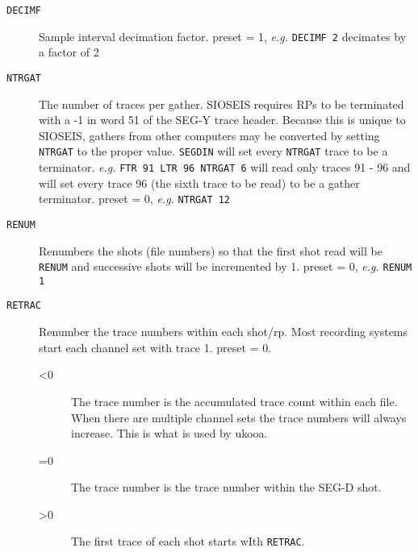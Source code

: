\begin{description}
\item[\texttt{DECIMF}] Sample interval decimation factor.  \Gls{preset} = 1,     \textit{e.g.}   \texttt{DECIMF 2} decimates by a factor of 2

\item[\texttt{NTRGAT}] The number of traces per \gls{gather}.  SIOSEIS requires RPs to be
         terminated with a -1 in word 51 of the SEG-Y trace header.
         Because this is unique to SIOSEIS, \glspl{gather} from other
         computers may be converted by setting \texttt{NTRGAT} to the proper
         value.  \texttt{SEGDIN} will set every \texttt{NTRGAT} trace to be a
         terminator.  \textit{e.g.} \texttt{FTR 91 LTR 96 NTRGAT 6} will read only
         traces 91 - 96 and will set every trace 96 (the sixth trace
         to be read) to be a \gls{gather} terminator.
         \Gls{preset} = 0,    \textit{e.g.}  \texttt{NTRGAT 12}

\item[\texttt{RENUM}] Renumbers the \glspl{shot} (file numbers) so that the first \gls{shot}
         read will be \texttt{RENUM} and successive \glspl{shot} will be incremented
         by 1.
         \Gls{preset} = 0,    \textit{e.g.}   \texttt{RENUM 1}

\item[\texttt{RETRAC}] Renumber the trace numbers within each \gls{shot}/\gls{rp}.  Most recording
         systems start each channel set with trace 1.
         \Gls{preset} = 0.
\begin{description}
     \item[<0] The trace number is the accumulated trace count within each
         file.  When there are multiple channel sets the trace numbers
         will always increase.  This is what is used by \gls{ukooa}.
     \item[=0] The trace number is the trace number within the SEG-D \gls{shot}.
     \item[>0] The first trace of each \gls{shot} starts wIth \texttt{RETRAC}.
\end{description}


\end{description}
